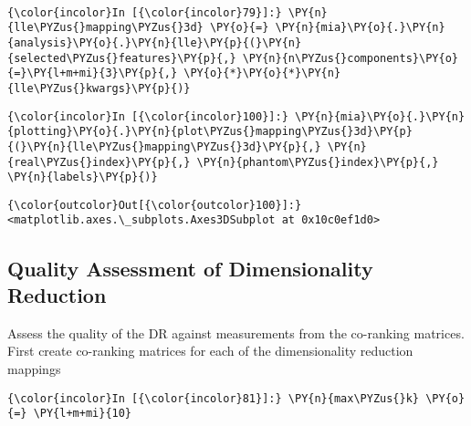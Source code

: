     \begin{center}
    \end{center}
    { \hspace*{\fill} \\}

    \begin{Verbatim}[commandchars=\\\{\}]
{\color{incolor}In [{\color{incolor}79}]:} \PY{n}{lle\PYZus{}mapping\PYZus{}3d} \PY{o}{=} \PY{n}{mia}\PY{o}{.}\PY{n}{analysis}\PY{o}{.}\PY{n}{lle}\PY{p}{(}\PY{n}{selected\PYZus{}features}\PY{p}{,} \PY{n}{n\PYZus{}components}\PY{o}{=}\PY{l+m+mi}{3}\PY{p}{,} \PY{o}{*}\PY{o}{*}\PY{n}{lle\PYZus{}kwargs}\PY{p}{)}
\end{Verbatim}

    \begin{Verbatim}[commandchars=\\\{\}]
{\color{incolor}In [{\color{incolor}100}]:} \PY{n}{mia}\PY{o}{.}\PY{n}{plotting}\PY{o}{.}\PY{n}{plot\PYZus{}mapping\PYZus{}3d}\PY{p}{(}\PY{n}{lle\PYZus{}mapping\PYZus{}3d}\PY{p}{,} \PY{n}{real\PYZus{}index}\PY{p}{,} \PY{n}{phantom\PYZus{}index}\PY{p}{,} \PY{n}{labels}\PY{p}{)}
\end{Verbatim}

            \begin{Verbatim}[commandchars=\\\{\}]
{\color{outcolor}Out[{\color{outcolor}100}]:} <matplotlib.axes.\_subplots.Axes3DSubplot at 0x10c0ef1d0>
\end{Verbatim}

    \subsection{Quality Assessment of Dimensionality
Reduction}\label{quality-assessment-of-dimensionality-reduction}

    Assess the quality of the DR against measurements from the co-ranking
matrices. First create co-ranking matrices for each of the
dimensionality reduction mappings

    \begin{Verbatim}[commandchars=\\\{\}]
{\color{incolor}In [{\color{incolor}81}]:} \PY{n}{max\PYZus{}k} \PY{o}{=} \PY{l+m+mi}{10}
\end{Verbatim}

